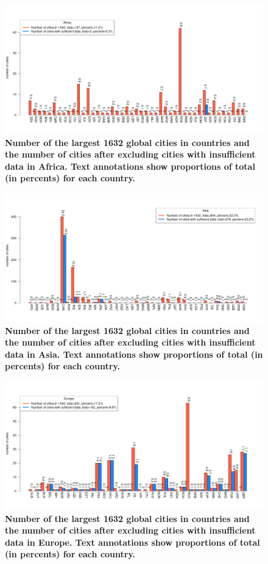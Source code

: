 \documentclass[preprint,10pt]{elsarticle} %
\begin{document}
\begin{figure}
\centering
\includegraphics[trim={ 0 35 25 50 },clip,scale=0.45]{Images2/Africa_cities.png}
\caption{\bf Number of the largest 1632 global cities in countries and the number of cities after excluding cities with insufficient data in Africa. Text annotations show proportions of total (in percents) for each country.}
 \label{fig:africa}
\end{figure}

\begin{figure}
\centering
\includegraphics[trim={ 0 35 25 50 },clip,scale=0.45]{Images2/Asia_cities.png}
\caption{\bf Number of the largest 1632 global cities in countries and the number of cities after excluding cities with insufficient data in Asia. Text annotations show proportions of total (in percents) for each country.}
 \label{fig:asia}
\end{figure}

\begin{figure}
\centering
\includegraphics[trim={ 0 35 25 50 },clip,scale=0.45]{Images2/Europe_cities.png}
\caption{\bf Number of the largest 1632 global cities in countries and the number of cities after excluding cities with insufficient data in Europe. Text annotations show proportions of total (in percents) for each country.}
 \label{fig:europe}
\end{figure}
\end{document}
